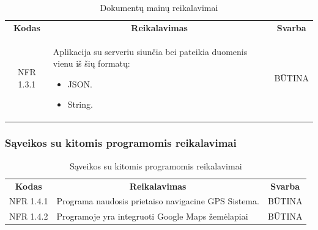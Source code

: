\documentclass{VUMIFPSkursinis}
\begin{document}
\begin{center}
	\begin{table}[H]
	\caption{Dokumentų mainų reikalavimai}
	\begin{tabular}{|p{2cm}|p{}|p{}|}
	\hline
	    \rowcolor{lightgray}
		\multicolumn{3}{|c|}{Dokumentų mainų reikalavimai}\\
		
	\hline
		\multicolumn{1}{|c|}{{\bfseries Kodas}}&
		\multicolumn{1}{|c|}{{\bfseries Reikalavimas}}&
		\multicolumn{1}{|c|}{{\bfseries Svarba}}\\
	\hline 	
		\multicolumn{1}{|c|}{NFR 1.3.1}&
		{Aplikacija su serveriu siunčia bei pateikia duomenis vienu iš šių formatų:
			\begin{itemize}
			\item JSON.
			\item String.
			\end{itemize}}&
		\multicolumn{1}{|c|}{BŪTINA}\\	
	
	\hline 	 	 	
	\end{tabular}
	
	\label{table:Dokumentųmainųreikalavimai}
	\end{table}

\end{center}

\pagebreak

\subsubsection{Sąveikos su kitomis programomis reikalavimai}

\begin{center}
	\begin{table}[H]
	\caption{Sąveikos su kitomis programomis reikalavimai}
	\begin{tabular}{|p{2cm}|p{}|p{}|}
	\hline
	    \rowcolor{lightgray}
		\multicolumn{3}{|c|}{Sąveikos su kitomis programomis reikalavimai}\\
		
	\hline
		\multicolumn{1}{|c|}{{\bfseries Kodas}}&
		\multicolumn{1}{|c|}{{\bfseries Reikalavimas}}&
		\multicolumn{1}{|c|}{{\bfseries Svarba}}\\
	\hline 	
		\multicolumn{1}{|c|}{NFR 1.4.1}&
		{Programa naudosis prietaiso navigacine GPS Sistema.}&
		\multicolumn{1}{|c|}{BŪTINA}\\	
	
	\hline 	
		\multicolumn{1}{|c|}{NFR 1.4.2}&
		{Programoje yra integruoti Google Maps žemėlapiai}&
		\multicolumn{1}{|c|}{BŪTINA}\\	
	
	\hline 	 	 	
	\end{tabular}
	
	\label{table:Sąveikossukitomisprogramomisreikalavimai}
	\end{table}

\end{center}
\end{document}
